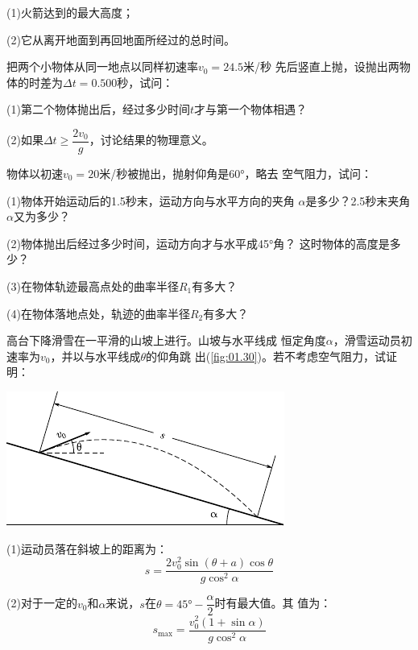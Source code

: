 \begin{exercises}
(1)火箭达到的最大高度；

(2)它从离开地面到再回地面所经过的总时间。

\exercise 把两个小物体从同一地点以同样初速率$v_0=24.5$米/秒
先后竖直上抛，设抛出两物体的时差为$\Delta t=0.500$秒，试问：

\renewcommand{\hsp}{\hspace{0.2em}}
{(1)第二个物体抛出后，经过多少时间\hsp $t$\hsp 才与第一个物体相遇？}

\vspace{-0.15em}(2)如果$\Delta t\geqslant\dfrac{2v_0}{g}$，讨论结果的物理意义。\vspace{-0.15em}

\exercise 物体以初速$v_0=20$米/秒被抛出，抛射仰角是\ang{60;;}，略去
空气阻力，试问：

(1)物体开始运动后的1.5秒末，运动方向与水平方向的夹角
$\alpha$是多少？2.5秒末夹角$\alpha$又为多少？

(2)物体抛出后经过多少时间，运动方向才与水平成\ang{45;;}角？
这时物体的高度是多少？

(3)在物体轨迹最高点处的曲率半径$R_1$有多大？

(4)在物体落地点处，轨迹的曲率半径$R_2$有多大？

\exercise 高台下降滑雪在一平滑的山坡上进行。山坡与水平线成
恒定角度$\alpha$，滑雪运动员初速率为$v_0$，并以与水平线成$\theta$的仰角跳
出(\ref{fig:01.30})。若不考虑空气阻力，试证明：
\begin{figurex}
    \centering
    \includegraphics{figure/fig01.30}
    \caption{}
    \label{fig:01.30}
\end{figurex}

(1)运动员落在斜坡上的距离为：
\begin{equation*}
    s=\frac{2 v_{0}^{2} \sin (\theta+a) \cos \theta}{g \cos ^{2} \alpha}
\end{equation*}

(2)对于一定的$v_0$和$\alpha$来说，$s$在$\theta=\ang{45;;}-\dfrac{\alpha}{2}$时有最大值。其
值为：
\begin{equation*}
    s_{\max }=\frac{v_{0}^{2}(1+\sin \alpha)}{g \cos ^{2} \alpha}
\end{equation*}


\end{exercises}
